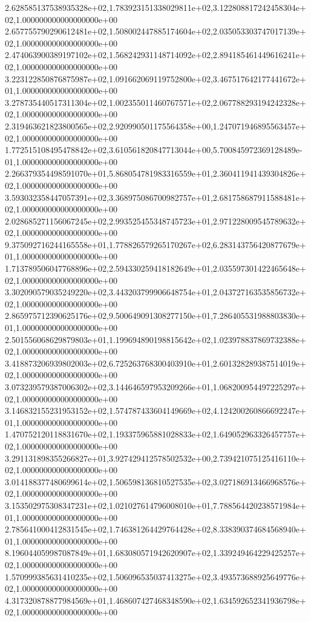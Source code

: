2.628585137538935328e+02,1.783923151338029811e+02,3.122808817242458304e+02,1.000000000000000000e+00
2.657755790290612481e+02,1.508002447885174604e+02,2.035053303747017139e+02,1.000000000000000000e+00
2.474063900389197102e+02,1.568242931148714092e+02,2.894185461449616241e+02,1.000000000000000000e+00
3.223122850876875987e+02,1.091662069119752800e+02,3.467517642177441672e+01,1.000000000000000000e+00
3.278735440517311304e+02,1.002355011460767571e+02,2.067788293194242328e+02,1.000000000000000000e+00
2.319463621823800565e+02,2.920990501175564358e+00,1.247071946895563457e+02,1.000000000000000000e+00
1.772515108495478842e+02,3.610561820847713044e+00,5.700845972369128489e-01,1.000000000000000000e+00
2.266379354498591070e+01,5.868054781983316559e+01,2.360411941439304826e+02,1.000000000000000000e+00
3.593032358447057391e+02,3.368975086700982757e+01,2.681758687911588481e+02,1.000000000000000000e+00
2.028685271156067245e+02,2.993525455348745723e+01,2.971228009545789632e+02,1.000000000000000000e+00
9.375092716244165558e+01,1.778826579265170267e+02,6.283143756420877679e+01,1.000000000000000000e+00
1.713789506047768896e+02,2.594330259418182649e+01,2.035597301422465648e+02,1.000000000000000000e+00
3.302090579035249220e+02,3.443203799906648754e+01,2.043727163535856732e+02,1.000000000000000000e+00
2.865975712390625176e+02,9.500649091308277150e+01,7.286405531988803830e+01,1.000000000000000000e+00
2.501556068629879803e+01,1.199694890198815642e+02,1.023978837869732388e+02,1.000000000000000000e+00
3.418873206939802003e+02,6.725263768300403910e+01,2.601328289387514019e+02,1.000000000000000000e+00
3.073239579387006302e+02,3.144646597953209266e+01,1.068200954497225297e+02,1.000000000000000000e+00
3.146832155231953152e+02,1.574787433604149669e+02,4.124200260866692247e+01,1.000000000000000000e+00
1.470752120118831670e+02,1.193375965881028833e+02,1.649052963326457757e+02,1.000000000000000000e+00
3.291131898355266827e+01,3.927429412578502532e+00,2.739421075125416110e+02,1.000000000000000000e+00
3.014188377480699614e+02,1.506598136810527535e+02,3.027186913466968576e+02,1.000000000000000000e+00
3.153502975308347231e+02,1.021027614796008010e+01,7.788564420238571984e+01,1.000000000000000000e+00
2.785641000412831545e+02,1.746381264429764428e+02,8.338390374684568940e+01,1.000000000000000000e+00
8.196044059987087849e+01,1.683080571942620907e+02,1.339249464229425257e+02,1.000000000000000000e+00
1.570999385631410235e+02,1.506096535037413275e+02,3.493573688925649776e+02,1.000000000000000000e+00
4.317320878877984569e+01,1.468607427468348590e+02,1.634592652341936798e+02,1.000000000000000000e+00
